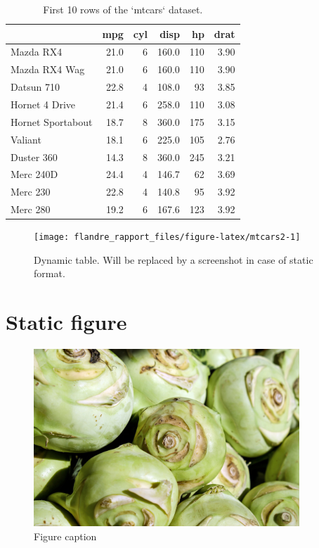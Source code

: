 \documentclass[twoside]{extreport}
\begin{document}
\begin{table}

\caption{\label{tab:mtcars}First 10 rows of the `mtcars` dataset.}
\centering
\begin{tabular}[t]{lrrrrr}
\toprule
  & mpg & cyl & disp & hp & drat\\
\midrule
Mazda RX4 & 21.0 & 6 & 160.0 & 110 & 3.90\\
Mazda RX4 Wag & 21.0 & 6 & 160.0 & 110 & 3.90\\
Datsun 710 & 22.8 & 4 & 108.0 & 93 & 3.85\\
Hornet 4 Drive & 21.4 & 6 & 258.0 & 110 & 3.08\\
Hornet Sportabout & 18.7 & 8 & 360.0 & 175 & 3.15\\
\addlinespace
Valiant & 18.1 & 6 & 225.0 & 105 & 2.76\\
Duster 360 & 14.3 & 8 & 360.0 & 245 & 3.21\\
Merc 240D & 24.4 & 4 & 146.7 & 62 & 3.69\\
Merc 230 & 22.8 & 4 & 140.8 & 95 & 3.92\\
Merc 280 & 19.2 & 6 & 167.6 & 123 & 3.92\\
\bottomrule
\end{tabular}
\end{table}

\begin{figure}

{\centering \texttt{[image: flandre\_rapport\_files/figure-latex/mtcars2-1]} 

}

\caption{Dynamic table. Will be replaced by a screenshot in case of static format.}\label{fig:mtcars2}
\end{figure}

\hypertarget{s:figuur-invoegen}{%
\section{Static figure}\label{s:figuur-invoegen}}

\begin{figure}

{\centering \includegraphics[width=3.94in]{kohlrabi-2266665-klein} 

}

\caption{Figure caption}\label{fig:koolrabi2}
\end{figure}
\end{document}
